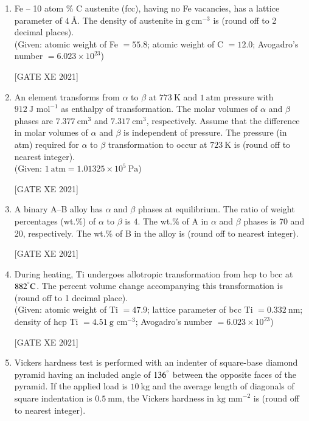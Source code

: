 \documentclass[journal,12pt,onecolumn]{IEEEtran}
\theoremstyle{remark}
\begin{document}
\begin{enumerate}[resume]
\item Fe – 10 atom \% C austenite (fcc), having no Fe vacancies, has a lattice parameter of $4\ \text{\AA}$. The density of austenite in $\text{g}\,\text{cm}^{-3}$ is \underline{\hspace{2cm}} (round off to 2 decimal places).\\
(Given: atomic weight of Fe $=55.8$; atomic weight of C $=12.0$; Avogadro’s number $=6.023\times 10^{23}$)

\hfill[GATE XE 2021]

\item An element transforms from $\alpha$ to $\beta$ at $773\ \text{K}$ and $1\ \text{atm}$ pressure with $912\ \text{J mol}^{-1}$ as enthalpy of transformation. The molar volumes of $\alpha$ and $\beta$ phases are $7.377\ \text{cm}^3$ and $7.317\ \text{cm}^3$, respectively. Assume that the difference in molar volumes of $\alpha$ and $\beta$ is independent of pressure. The pressure (in atm) required for $\alpha$ to $\beta$ transformation to occur at $723\ \text{K}$ is \underline{\hspace{2cm}} (round off to nearest integer).\\
(Given: $1\ \text{atm}=1.01325\times 10^{5}\ \text{Pa}$)

\hfill[GATE XE 2021]

\item A binary A–B alloy has $\alpha$ and $\beta$ phases at equilibrium. The ratio of weight percentages (wt.\%) of $\alpha$ to $\beta$ is $4$. The wt.\% of A in $\alpha$ and $\beta$ phases is 70 and 20, respectively. The wt.\% of B in the alloy is \underline{\hspace{2cm}} (round off to nearest integer).

\hfill[GATE XE 2021]

\item During heating, Ti undergoes allotropic transformation from hcp to bcc at $882^\degree\text{C}$. The percent volume change accompanying this transformation is \underline{\hspace{2cm}} (round off to 1 decimal place).\\
(Given: atomic weight of Ti $=47.9$; lattice parameter of bcc Ti $=0.332\ \text{nm}$; density of hcp Ti $=4.51\ \text{g cm}^{-3}$; Avogadro’s number $=6.023\times 10^{23}$)

\hfill[GATE XE 2021]

\item Vickers hardness test is performed with an indenter of square-base diamond pyramid having an included angle of $136^\degree$ between the opposite faces of the pyramid. If the applied load is $10\ \text{kg}$ and the average length of diagonals of square indentation is $0.5\ \text{mm}$, the Vickers hardness in $\text{kg mm}^{-2}$ is \underline{\hspace{2cm}} (round off to nearest integer).


\end{enumerate}
\end{document}
